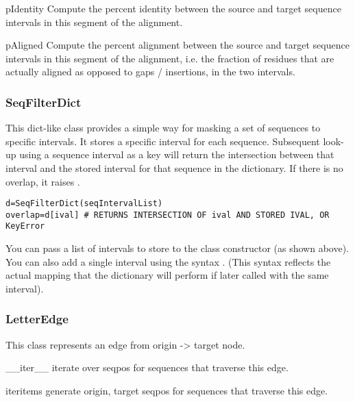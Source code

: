 \documentclass{howto}
\begin{document}
\begin{funcdesc}{pIdentity}{}
  Compute the percent identity between the source and target sequence
  intervals in this segment of the alignment.
\end{funcdesc}

\begin{funcdesc}{pAligned}{}
  Compute the percent alignment between the source and target sequence
  intervals in this segment of the alignment, i.e. the fraction of
  residues that are actually aligned as opposed to gaps / insertions,
  in the two intervals.
\end{funcdesc}

\subsubsection{SeqFilterDict}
This dict-like class provides a simple way for masking a set of sequences
to specific intervals.  It stores a specific interval for each
sequence.  Subsequent look-up using a sequence interval as a key will
return the intersection between that interval and the stored interval
for that sequence in the dictionary.  If there is no overlap, it
raises .

\begin{verbatim}
d=SeqFilterDict(seqIntervalList)
overlap=d[ival] # RETURNS INTERSECTION OF ival AND STORED IVAL, OR KeyError
\end{verbatim}

You can pass a list of intervals to store to the class constructor (as 
shown above).  You can also add a single interval using the syntax
.  (This syntax reflects the actual
mapping that the dictionary will perform if later called with the
same interval).

\subsubsection{LetterEdge}
This class represents an edge from origin -> target node.

\begin{funcdesc}{__iter__}{}
  iterate over seqpos for sequences that traverse this edge.
\end{funcdesc}

\begin{funcdesc}{iteritems}{}
  generate origin, target seqpos for sequences that traverse this edge.
\end{funcdesc}
\end{document}
